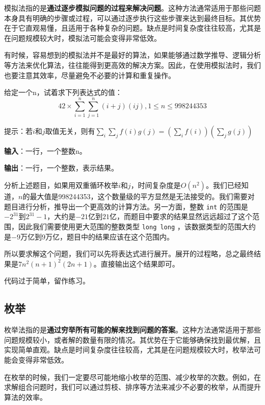 模拟法指的是\textbf{通过逐步模拟问题的过程来解决问题}。这种方法通常适用于那些问题本身具有明确的步骤或过程，可以通过逐步执行这些步骤来达到最终目标。其优势在于它直观易懂，且适用于各种复杂的问题。缺点是时间复杂度往往较高，尤其是在问题规模较大时，模拟法可能会变得非常低效。

有时候，容易想到的模拟法并不是最好的算法，如果能够通过数学推导、逻辑分析等方法来优化算法，往往能得到更高效的解决方案。因此，在使用模拟法时，我们也要注意其效率，尽量避免不必要的计算和重复操作。

\begin{example}
    给定一个n，试着求下列表达式的值：
    $$42 \times \sum_{i=1}^{n} \sum_{j=1}^{n}(i+j)(ij) , 1\leqslant n \leqslant 998244353 $$

    提示：若$i$和$j$取值无关，则有$\sum_i \sum_j f(i)g(j) =( \sum_i f(i)) (\sum_j g(j))$

    \textbf{输入}：一行，一个整数n。

    \textbf{输出}：一行，一个整数，表示结果。
\end{example}

\begin{answer}
    分析上述题目，如果用双重循环枚举$i$和$j$，时间复杂度是$O(n^2)$。我们已经知道，$n$的最大值是998244353，这个数量级的平方显然是无法接受的。我们需要对题目进行分析，推导出一个更高效的计算方法。另一方面，整数 \texttt{int} 的范围是$-2^{31}$到$2^{31}-1$，大约是$-21$亿到$21$亿，而题目中要求的结果显然远远超过了这个范围，因此我们需要使用更大范围的整数类型 \texttt{long long} ，该数据类型的范围大约是$-9$万亿到$9$万亿，题目中的结果应该在这个范围内。

    所以要求解这个问题，我们可以先将表达式进行展开。展开的过程略，总之最终结果是$7n^2(n+1)^2(2n+1)$。直接输出这个结果即可。

    代码过于简单，留作练习。
\end{answer}

\subsection{枚举}

枚举法指的是\textbf{通过穷举所有可能的解来找到问题的答案}。这种方法通常适用于那些问题规模较小，或者解的数量有限的情况。其优势在于它能够确保找到最优解，且实现简单直观。缺点是时间复杂度往往较高，尤其是在问题规模较大时，枚举法可能会变得非常低效。

在枚举的时候，我们一定要尽可能地缩小枚举的范围、减少枚举的次数。例如，在求解组合问题时，我们可以通过剪枝、排序等方法来减少不必要的枚举，从而提升算法的效率。

